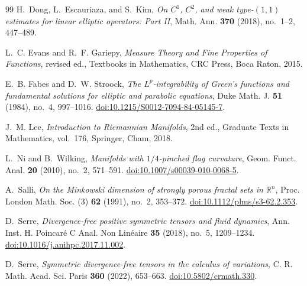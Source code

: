 \documentclass[11pt,reqno]{amsart}
\theoremstyle{definition}
\theoremstyle{remark}
\newcommand{\R}{\mathbb R}
\begin{document}
\begin{thebibliography}{99}
H.~Dong, L.~Escauriaza, and S.~Kim,
\emph{On $C^1$, $C^2$, and weak type-$(1,1)$ estimates for linear elliptic operators: Part II},
Math. Ann. \textbf{370} (2018), no.~1--2, 447--489.

L.~C. Evans and R.~F. Gariepy,
\emph{Measure Theory and Fine Properties of Functions},
revised ed., Textbooks in Mathematics, CRC Press, Boca Raton, 2015.

E.~B. Fabes and D.~W. Stroock,
\emph{The $L^p$-integrability of Green's functions and fundamental solutions for elliptic and parabolic equations},
Duke Math. J. \textbf{51} (1984), no.~4, 997--1016.
\href{https://doi.org/10.1215/S0012-7094-84-05145-7}{doi:10.1215/S0012-7094-84-05145-7}.

J.~M. Lee,
\emph{Introduction to Riemannian Manifolds},
2nd ed., Graduate Texts in Mathematics, vol.~176, Springer, Cham, 2018.

L.~Ni and B.~Wilking,
\emph{Manifolds with $1/4$-pinched flag curvature},
Geom. Funct. Anal. \textbf{20} (2010), no.~2, 571--591.
\href{https://doi.org/10.1007/s00039-010-0068-5}{doi:10.1007/s00039-010-0068-5}.

A.~Salli,
\emph{On the Minkowski dimension of strongly porous fractal sets in $\R^n$},
Proc. London Math. Soc. (3) \textbf{62} (1991), no.~2, 353--372.
\href{https://doi.org/10.1112/plms/s3-62.2.353}{doi:10.1112/plms/s3-62.2.353}.

D.~Serre,
\emph{Divergence-free positive symmetric tensors and fluid dynamics},
Ann. Inst. H. Poincar\'e C Anal. Non Lin\'eaire \textbf{35} (2018), no.~5, 1209--1234.
\href{https://doi.org/10.1016/j.anihpc.2017.11.002}{doi:10.1016/j.anihpc.2017.11.002}.

D.~Serre,
\emph{Symmetric divergence-free tensors in the calculus of variations},
C. R. Math. Acad. Sci. Paris \textbf{360} (2022), 653--663.
\href{https://doi.org/10.5802/crmath.330}{doi:10.5802/crmath.330}.

\end{thebibliography}
\end{document}
